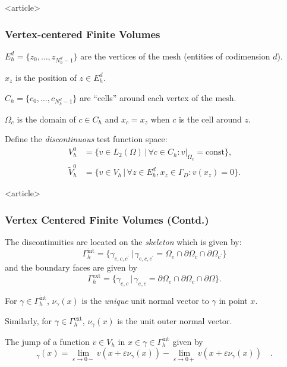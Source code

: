 \begin{onlyenv}<article>
\frametitle<presentation>{Vertex-centered Finite Volumes}
\begin{window}
$E_h^d=\{z_0,\ldots,z_{N_h^d-1}\}$ are the vertices of the mesh
(entities of codimension $d$).

$x_z$ is the position of $z\in E_h^d$.

$C_h = \{c_0,\ldots,c_{N_h^d-1}\}$ are ``cells'' around each vertex of
the mesh.
\end{window}

$\Omega_c$ is the domain of $c\in C_h$ and $x_c=x_z$ when $c$ is the
cell around $z$.

Define the \textit{discontinuous} test function space:
\begin{align*}
V_h^0 & = \{ v\in L_2(\Omega) \,|\, \forall c\in C_h : v|_{\Omega_c} =
\text{const} \},\\
\tilde{V}_h^0 &= \{ v\in V_h \,|\, \forall z\in E_h^d, x_z\in\Gamma_D : v(x_z)=0\}.
\end{align*}

\end{onlyenv}

\begin{frame}<article>
\frametitle<presentation>{Vertex Centered Finite Volumes (Contd.)}
The discontinuities are located on the \textit{skeleton} which is given by:
\begin{equation*}
\Gamma_h^{\text{int}} = \{\gamma_{e,c,c^\prime} \,|\,
\gamma_{e,c,c^\prime} = \Omega_e \cap \partial\Omega_c \cap
\partial\Omega_{c^\prime} \}
\end{equation*}
and the boundary faces are given by
\begin{equation*}
\Gamma_h^{\text{ext}} = \{\gamma_{e,c} \,|\,
\gamma_{e,c} = \partial\Omega_e \cap \partial\Omega_c \cap
\partial\Omega \}.
\end{equation*}

For $\gamma\in\Gamma_h^{\text{int}}$, $\nu_\gamma(x)$ is
the \textit{unique} unit
normal vector to $\gamma$ in point $x$.

Similarly, for
$\gamma\in\Gamma_h^{\text{ext}}$, $\nu_\gamma(x)$ is the unit outer
normal vector.

The jump of a function $v\in V_h$ in
$x\in\gamma\in\Gamma_h^{\text{int}}$ given by
\begin{equation*}
[v]_\gamma(x) = \lim_{\varepsilon\to 0-} v(x+\varepsilon \nu_\gamma(x))
-  \lim_{\varepsilon\to 0+} v(x+\varepsilon \nu_\gamma(x))\quad.
\end{equation*}
\end{frame}

